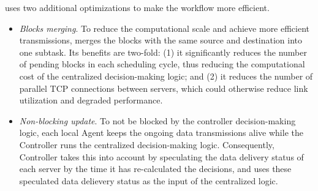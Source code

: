\name uses two additional optimizations to make the workflow
more efficient.
\begin{itemize}
\item \emph{Blocks merging}.
To reduce the computational scale and achieve more efficient 
transmissions, \name merges the blocks with the same source and 
destination into one subtask. Its benefits are two-fold: (1) it 
significantly reduces the number of pending blocks in each 
scheduling cycle, thus reducing the computational cost of the 
centralized decision-making logic; and (2) it reduces the number
of parallel TCP connections between servers, which could 
otherwise reduce link utilization and degraded performance.
\item \emph{Non-blocking update}. 
To not be blocked by the controller decision-making logic, each 
local Agent  keeps the ongoing data transmissions alive while the 
Controller runs the centralized decision-making logic. 
Consequently, Controller takes this into account by speculating the 
data delivery status of each server by the time it has re-calculated
the decisions, and uses these speculated data delievery status as
the input of the centralized logic.
\end{itemize}

%
%
%
%

